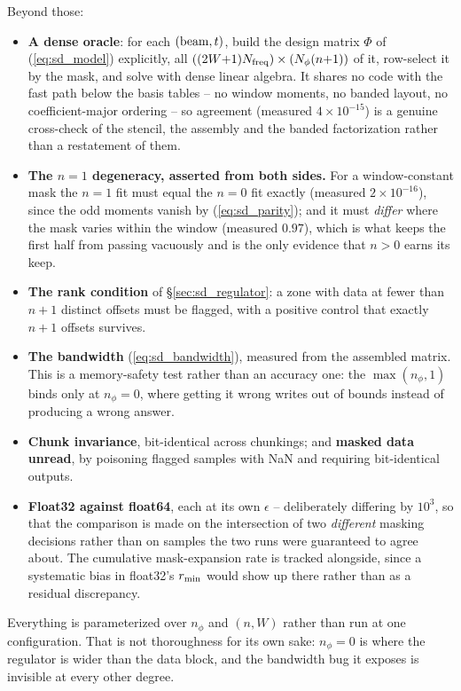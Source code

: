 \documentclass{article}
\numberwithin{equation}{section}   %
\begin{document}
Beyond those:
\begin{itemize}
\item {\bf A dense oracle}: for each $({\rm beam}, t)$, build the design matrix $\Phi$ of (\ref{eq:sd_model})
explicitly, all $((2W{+}1)N_{\rm freq}) \times (N_\phi(n{+}1))$ of it, row-select it by the mask, and solve
with dense linear algebra.  It shares no
code with the fast path below the basis tables -- no window moments, no banded layout, no coefficient-major
ordering -- so agreement (measured $4\times10^{-15}$) is a genuine cross-check of the stencil, the assembly and
the banded factorization rather than a restatement of them.
\item {\bf The $n=1$ degeneracy, asserted from both sides.}  For a window-constant mask the $n=1$ fit must
equal the $n=0$ fit exactly (measured $2\times10^{-16}$), since the odd moments vanish by
(\ref{eq:sd_parity}); and it must {\em differ} where the mask varies within the window (measured $0.97$),
which is what keeps the first half from passing vacuously and is the only evidence that $n>0$ earns its keep.
\item {\bf The rank condition} of \S\ref{sec:sd_regulator}: a zone with data at fewer than $n+1$ distinct
offsets must be flagged, with a positive control that exactly $n+1$ offsets survives.
\item {\bf The bandwidth} (\ref{eq:sd_bandwidth}), measured from the assembled matrix.  This is a memory-safety
test rather than an accuracy one: the $\max(n_\phi,1)$ binds only at $n_\phi = 0$, where getting it wrong
writes out of bounds instead of producing a wrong answer.
\item {\bf Chunk invariance}, bit-identical across chunkings; and {\bf masked data unread}, by poisoning
flagged samples with NaN and requiring bit-identical outputs.
\item {\bf Float32 against float64}, each at its own $\epsilon$ -- deliberately differing by $10^3$, so that
the comparison is made on the intersection of two {\em different} masking decisions rather than on samples the
two runs were guaranteed to agree about.  The cumulative mask-expansion rate is tracked alongside, since a
systematic bias in float32's $r_{\rm min}$ would show up there rather than as a residual discrepancy.
\end{itemize}
Everything is parameterized over $n_\phi$ and $(n,W)$ rather than run at one configuration.  That is not
thoroughness for its own sake: $n_\phi = 0$ is where the regulator is wider than the data block, and the
bandwidth bug it exposes is invisible at every other degree.
\end{document}
